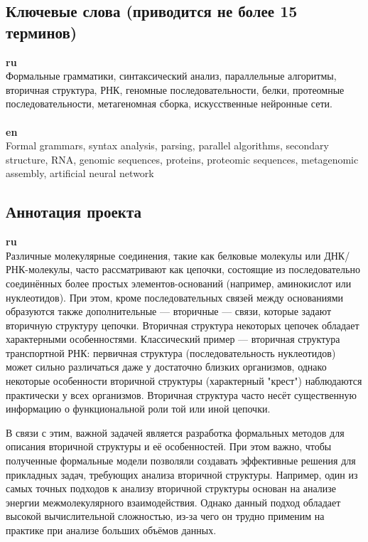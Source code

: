 \documentclass[12pt]{article}  %
\theoremstyle{remark}
\begin{document}
\subsection{Ключевые слова (приводится не более 15 терминов)}

\textbf{ru}\\
Формальные грамматики, синтаксический анализ, параллельные алгоритмы, вторичная структура, РНК, геномные последовательности, белки, протеомные последовательности, метагеномная сборка, искусственные нейронные сети.
\\
\\
\textbf{en}\\
Formal grammars, syntax analysis, parsing, parallel algorithms, secondary structure, RNA, genomic sequences, proteins, proteomic sequences, metagenomic assembly, artificial neural network


\subsection{Аннотация проекта}
\textbf{ru}\\
Различные молекулярные соединения, такие как белковые молекулы или ДНК/РНК-молекулы, часто рассматривают как цепочки, состоящие из последовательно соединённых более простых элементов-оснований (например, аминокислот или нуклеотидов).
При этом, кроме последовательных связей между основаниями образуются также дополнительные --- вторичные --- связи, которые задают вторичную структуру цепочки.
Вторичная структура некоторых цепочек обладает характерными особенностями.
Классический пример --- вторичная структура транспортной РНК: первичная структура (последовательность нуклеотидов) может сильно различаться даже у достаточно близких организмов, однако некоторые особенности вторичной структуры (характерный "крест") наблюдаются практически у всех организмов. Вторичная структура часто несёт существенную информацию о функциональной роли той или иной цепочки.

В связи с этим, важной задачей является разработка формальных методов для описания вторичной структуры и её особенностей.
При этом важно, чтобы полученные формальные модели позволяли создавать эффективные решения для прикладных задач, требующих анализа вторичной структуры.
Например, один из самых точных подходов к анализу вторичной структуры основан на анализе энергии межмолекулярного взаимодействия.
Однако данный подход обладает высокой вычислительной сложностью, из-за чего он трудно применим на практике при анализе больших объёмов данных.
\end{document}
